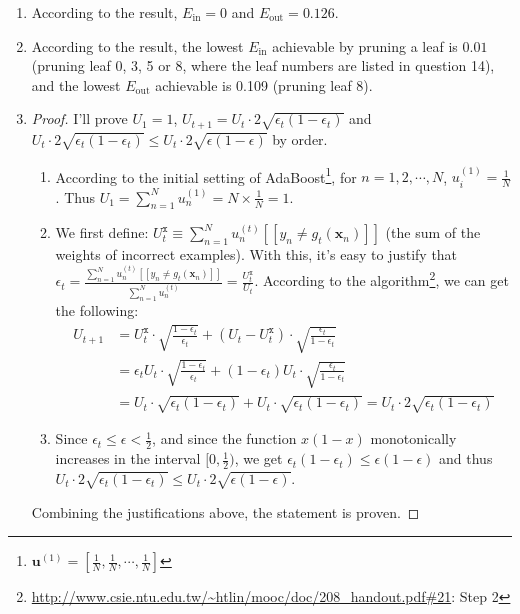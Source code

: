 \documentclass[11pt]{article}
\begin{document}
\begin{enumerate}[label=\textbf{\arabic*}.]

  \item According to the result, $E_{\text{in}} = 0$ and $E_{\text{out}} = 0.126$.

  \item According to the result, the lowest $E_{\text{in}}$ achievable by pruning a leaf is $0.01$ (pruning leaf 0, 3, 5 or 8, where the leaf numbers are listed in question 14), and the lowest $E_{\text{out}}$ achievable is 0.109 (pruning leaf 8).
  \item \begin{proof}
  I'll prove $U_1 = 1$, $U_{t+1}=U_t \cdot 2\sqrt{\epsilon_t(1-\epsilon_t)}$ and $U_t \cdot 2\sqrt{\epsilon_t(1-\epsilon_t)} \leq U_t \cdot 2\sqrt{\epsilon(1-\epsilon)}$ by order.
  \begin{enumerate}
    \item According to the initial setting of AdaBoost\footnote{$\mathbf{u}^{(1)}=[\frac{1}{N}, \frac{1}{N}, \cdots, \frac{1}{N}]$}, for $n=1, 2, \cdots, N$, $u_i^{(1)} = \frac{1}{N}$. Thus $U_1 = \sum_{n=1}^N u_n^{(1)}=N \times \frac{1}{N} = 1$.

    \item We first define: $U_t^\mathtt{x} \equiv \sum_{n=1}^N u_n^{(t)}[\![ y_n \neq g_t(\mathbf{x}_n) ]\!]$ (the sum of the weights of incorrect examples). With this, it's easy to justify that $\epsilon_t = \frac{\sum_{n=1}^N u_n^{(t)}[\![ y_n \neq g_t(\mathbf{x}_n) ]\!]}{\sum_{n=1}^N u_n^{(t)}} = \frac{U_t^\mathtt{x}}{U_t}$. According to the algorithm\footnote{\url{http://www.csie.ntu.edu.tw/~htlin/mooc/doc/208_handout.pdf\#21}: Step 2}, we can get the following:
    \[\begin{aligned} U_{t+1}  &= U_t^\mathtt{x} \cdot \sqrt{\frac{1-\epsilon_t}{\epsilon_t}}+ (U_t - U_t^\mathtt{x})\cdot \sqrt{\frac{\epsilon_t}{1-\epsilon_t}} \\ & = \epsilon_t U_t \cdot \sqrt{\frac{1-\epsilon_t}{\epsilon_t}}+ (1-\epsilon_t)U_t\cdot \sqrt{\frac{\epsilon_t}{1-\epsilon_t}} \\ &= U_t \cdot \sqrt{\epsilon_t(1-\epsilon_t)} + U_t \cdot \sqrt{\epsilon_t(1-\epsilon_t)} = U_t \cdot 2\sqrt{\epsilon_t(1-\epsilon_t)} \end{aligned}\]

    \item Since $\epsilon_t \leq \epsilon < \frac{1}{2}$, and since the function $x(1-x)$ monotonically increases in the interval $[0, \frac{1}{2})$, we get $\epsilon_t(1-\epsilon_t) \leq \epsilon(1-\epsilon)$ and thus $U_t \cdot 2\sqrt{\epsilon_t(1-\epsilon_t)} \leq U_t \cdot 2\sqrt{\epsilon(1-\epsilon)}$.
  \end{enumerate}
  Combining the justifications above, the statement is proven.
  \end{proof}


\end{enumerate}
\end{document}

